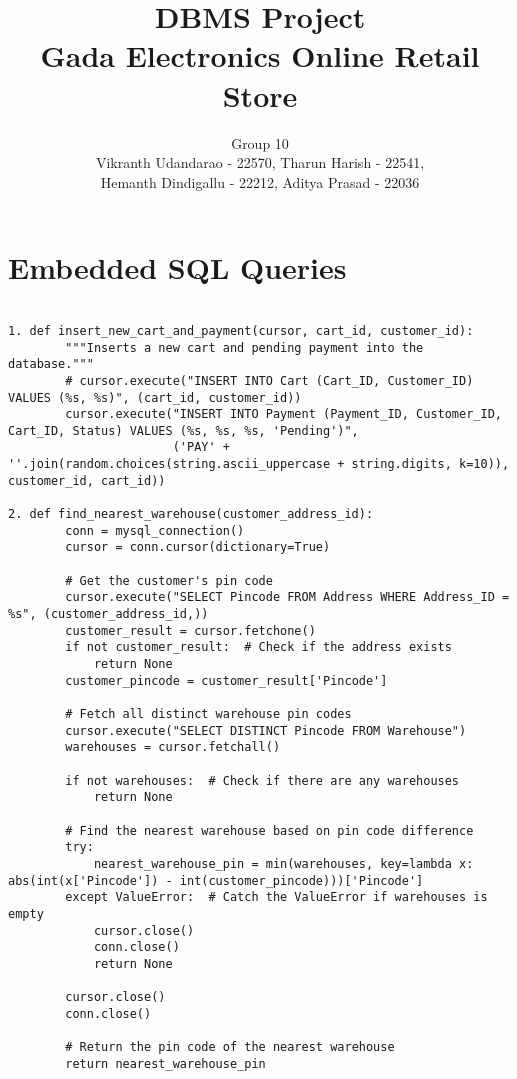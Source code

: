 \documentclass[12pt]{article}
\begin{document}
\title{\textbf{DBMS Project\\ Gada Electronics Online Retail Store}}
\author{Group 10 \\ Vikranth Udandarao - 22570, Tharun Harish - 22541, \\ Hemanth Dindigallu - 22212, Aditya Prasad - 22036}
\date{}
\maketitle

\section*{Embedded SQL Queries}

\begin{verbatim}

1. def insert_new_cart_and_payment(cursor, cart_id, customer_id):
        """Inserts a new cart and pending payment into the database."""
        # cursor.execute("INSERT INTO Cart (Cart_ID, Customer_ID) VALUES (%s, %s)", (cart_id, customer_id))
        cursor.execute("INSERT INTO Payment (Payment_ID, Customer_ID, Cart_ID, Status) VALUES (%s, %s, %s, 'Pending')", 
                       ('PAY' + ''.join(random.choices(string.ascii_uppercase + string.digits, k=10)), customer_id, cart_id))

2. def find_nearest_warehouse(customer_address_id):
        conn = mysql_connection()
        cursor = conn.cursor(dictionary=True)
    
        # Get the customer's pin code
        cursor.execute("SELECT Pincode FROM Address WHERE Address_ID = %s", (customer_address_id,))
        customer_result = cursor.fetchone()
        if not customer_result:  # Check if the address exists
            return None
        customer_pincode = customer_result['Pincode']
    
        # Fetch all distinct warehouse pin codes
        cursor.execute("SELECT DISTINCT Pincode FROM Warehouse")
        warehouses = cursor.fetchall()
    
        if not warehouses:  # Check if there are any warehouses
            return None
    
        # Find the nearest warehouse based on pin code difference
        try:
            nearest_warehouse_pin = min(warehouses, key=lambda x: abs(int(x['Pincode']) - int(customer_pincode)))['Pincode']
        except ValueError:  # Catch the ValueError if warehouses is empty
            cursor.close()
            conn.close()
            return None
    
        cursor.close()
        conn.close()
    
        # Return the pin code of the nearest warehouse
        return nearest_warehouse_pin

\end{verbatim}
\end{document}
